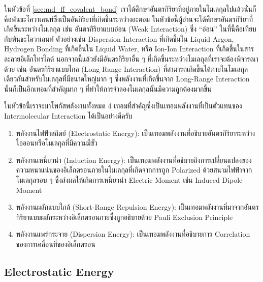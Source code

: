 ในหัวข้อที่ \ref{sec:md_ff_covalent_bond} เราได้ศึกษาอันตรกิริยาที่อยู่ภายในโมเลกุลไปแล้วนั่นก็คือพันธะโควาเลนท์ซึ่งเป็นอันกิริยาที่เกิดขึ้นระหว่างอะตอม ในหัวข้อนี้ผู้อ่านจะได้ศึกษาอันตรกิริยาที่เกิดขึ้นระหว่างโมเลกุล เช่น อันตรกิริยาแบบอ่อน (Weak Interaction) ซึ่ง \enquote{อ่อน} ในที่นี้คือเทียบกับพันธะโควาเลนท์ ตัวอย่างเช่น Dispersion Interaction ที่เกิดขึ้นใน Liquid Argon, Hydrogen Bonding ที่เกิดขึ้นใน Liquid Water, หรือ Ion-Ion Interaction ที่เกิดขึ้นในสารละลายอิเล็กโทรไลต์ นอกจากนี้แล้วยังมีอันตรกิริยาอื่น ๆ ที่เกิดขึ้นระหว่างโมเลกุลที่เราจะต้องพิจารณาด้วย เช่น อันตรกิริยาแบบไกล (Long-Range Interaction) ที่สามารถเกิดขึ้นได้ภายในโมเลกุลเดียวกันสำหรับโมเลกุลที่มีขนาดใหญ่มาก ๆ ซึ่งพลังงานที่เกิดขึ้นจาก Long-Range Interaction นั้นก็เป็นอีกเทอมที่สำคัญมาก ๆ ที่ทำให้การจำลองโมเลกุลนั้นมีความถูกต้องมากขึ้น

ในหัวข้อนี้เราจะมาโพกัสพลังงานทั้งหมด 4 เทอมที่สำคัญซึ่งเป็นเทอมพลังงานที่เป็นตัวแทนของ Intermolecular Interaction ได้เป็นอย่างดีครับ

\begin{enumerate}[topsep=0pt,noitemsep]
  \setlength\itemsep{0.5em}
  \item พลังงานไฟฟ้าสถิตย์ (Electrostatic Energy): เป็นเทอมพลังงานที่อธิบายอันตรกิริยาระหว่างไอออนหรือโมเลกุลที่มีความมีขั้ว

  \item พลังงานเหนี่ยวนำ (Induction Energy): เป็นเทอมพลังงานที่อธิบายถึงการเปลี่ยนแปลงของความหนาแน่นของอิเล็กตรอนภายในโมเลกุลที่เกิดจากการถูก Polarized ด้วยสนามไฟฟ้าจากโมเลกุลรอบ ๆ ซึ่งส่งผลให้เกิดการเหนี่ยวนำ Electric Moment เช่น Induced Dipole Moment

  \item พลังงานผลักแบบใกล้ (Short-Range Repulsion Energy): เป็นเทอมพลังงานที่มาจากอันตรกิริยาแบบผลักระหว่างอิเล็กตรอนภายซึ่งถูกอธิบายด้วย Pauli Exclusion Principle

  \item พลังงานแพร่กระจาย (Dispersion Energy): เป็นเทอมพลังงานที่อธิบายการ Correlation ของการเคลื่อนที่ของอิเล็กตรอน
\end{enumerate}

\subsection{Electrostatic Energy}

